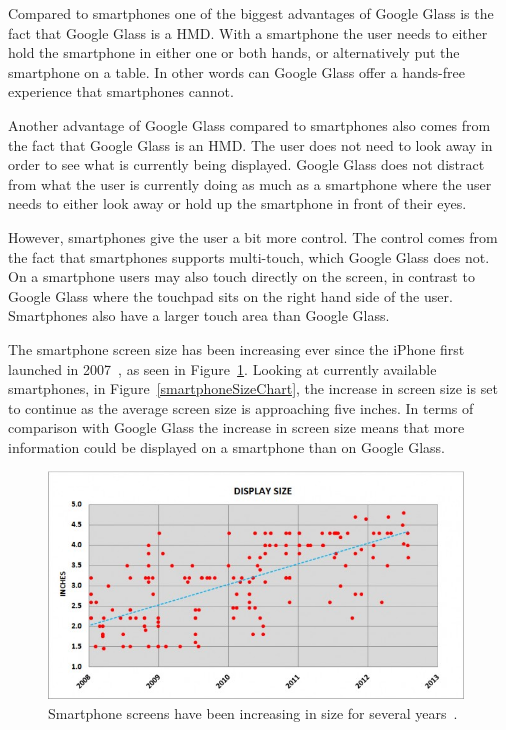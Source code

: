 Compared to smartphones one of the biggest advantages of Google Glass is the fact that Google Glass is a HMD. With a smartphone the user needs to either hold the smartphone in either one or both hands, or alternatively put the smartphone on a table. In other words can Google Glass offer a hands-free experience that smartphones cannot.

Another advantage of Google Glass compared to smartphones also comes from the fact that Google Glass is an HMD. The user does not need to look away in order to see what is currently being displayed. Google Glass does not distract from what the user is currently doing as much as a smartphone where the user needs to either look away or hold up the smartphone in front of their eyes.

However, smartphones give the user a bit more control. The control comes from the fact that smartphones supports multi-touch, which Google Glass does not. On a smartphone users may also touch directly on the screen, in contrast to Google Glass where the touchpad sits on the right hand side of the user. Smartphones also have a larger touch area than Google Glass.

The smartphone screen size has been increasing ever since the iPhone first launched in 2007~\cite{iphoneWiki}, as seen in Figure~\ref{smartphoneSizeChart2}. Looking at currently available smartphones, in Figure~\ref{smartphoneSizeChart}, the increase in screen size is set to continue as the average screen size is approaching five inches. In terms of comparison with Google Glass the increase in screen size means that more information could be displayed on a smartphone than on Google Glass.

	\begin{figure}[ht!]
		\centering
		\includegraphics[width=110mm]{images/smartphoneSize2}
		\caption{Smartphone screens have been increasing in size for several years~\cite{smartphoneSizeChart2}.}
		\label{smartphoneSizeChart2}
	\end{figure}
	

